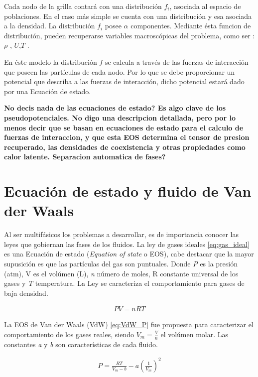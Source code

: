 Cada nodo de la grilla contará con una distribución $f_{i}$, asociada al espacio de poblaciones. En el caso más simple se cuenta con una distribución y esa asociada a la densidad. La distribución $f_{i}$ posee $\alpha$ componentes. Mediante ésta funcion de distribución, pueden recuperarse variables macroscópicas del problema, como ser : $\rho$ , $U$,$T$ .

En éste modelo la distribución $f$ se calcula a través de las fuerzas de interacción que poseen las partículas de cada nodo. Por lo que se debe proporcionar un potencial que describa a las fuerzas de interacción, dicho potencial estará dado por una Ecuación de estado.



\textbf{No decis nada de las ecuaciones de estado? Es algo clave de los pseudopotenciales. No digo una descripcion detallada, pero por lo menos decir que se basan en ecuaciones de estado para el calculo de fuerzas de interaccion, y que esta EOS determina el tensor de presion recuperado, las densidades de coexistencia y otras propiedades como calor latente. 
Separacion automatica de fases?}

\section{Ecuación de estado y fluido de Van der Waals}

Al ser multifásicos los problemas a desarrollar, es de importancia conocer las leyes que gobiernan las fases de los fluidos. La ley de gases ideales \ref{eq:gas_ideal} es una Ecuación de estado (\textit{Equation of state} o EOS), cabe destacar que la mayor supusición es que las partículas del gas son puntuales. Donde \textit{P} es la presión (atm), V es el volúmen (L), \textit{n} número de moles, R constante universal de los gases y \textit{T} temperatura. La Ley se  caracteriza el comportamiento para gases de baja densidad.

\begin{align}
P V = n R T
\label{eq:gas_ideal}
\end{align}

La EOS de Van der Waals (VdW) \ref{eq:VdW_P} fue propuesta para caracterizar el comportamiento de los gases reales, siendo $V_m = \frac{V}{n}$ el volúmen molar. Las constantes \textit{a} y \textit{b} son características de cada fluido.

\begin{align}
P = \frac{R T}{V_m - b} - a {(\frac{1}{V_m})}^2
\label{eq:VdW_P}
\end{align}


